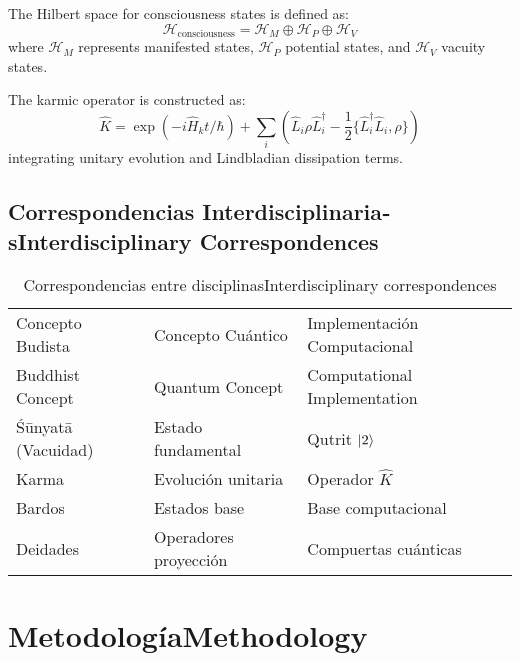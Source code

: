 \documentclass[12pt,a4paper]{article}
\newcommand{\es}[1]{\foreignlanguage{spanish}{#1}}
\newcommand{\en}[1]{\foreignlanguage{english}{#1}}
\begin{document}
\begin{otherlanguage}{english}
The Hilbert space for consciousness states is defined as:
\begin{equation}
\mathcal{H}_{\text{consciousness}} = \mathcal{H}_M \oplus \mathcal{H}_P \oplus \mathcal{H}_V
\end{equation}
where $\mathcal{H}_M$ represents manifested states, $\mathcal{H}_P$ potential states, and $\mathcal{H}_V$ vacuity states.

The karmic operator is constructed as:
\begin{equation}
\hat{K} = \exp\left(-i\hat{H}_k t/\hbar\right) + \sum_i \left(\hat{L}_i \rho \hat{L}_i^\dagger - \frac{1}{2}\{\hat{L}_i^\dagger \hat{L}_i, \rho\}\right)
\end{equation}
integrating unitary evolution and Lindbladian dissipation terms.
\end{otherlanguage}

\subsection{\es{Correspondencias Interdisciplinarias}\en{Interdisciplinary Correspondences}}

\begin{otherlanguage}{spanish}
\begin{table}[H]
\centering
\caption{\es{Correspondencias entre disciplinas}\en{Interdisciplinary correspondences}}
\begin{tabular}{p{} p{} p{}}
\toprule
\es{Concepto Budista} & \es{Concepto Cuántico} & \es{Implementación Computacional} \\
\en{Buddhist Concept} & \en{Quantum Concept} & \en{Computational Implementation} \\
\midrule
Śūnyatā (Vacuidad) & Estado fundamental & Qutrit $\ket{2}$ \\
Karma & Evolución unitaria & Operador $\hat{K}$ \\
Bardos & Estados base & Base computacional \\
Deidades & Operadores proyección & Compuertas cuánticas \\
\bottomrule
\end{tabular}
\end{table}
\end{otherlanguage}

\section{\es{Metodología}\en{Methodology}}
\end{document}
